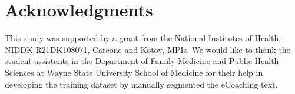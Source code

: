 \documentclass{amia}
\begin{document}
\section*{Acknowledgments}
This study was supported by a grant from the National Institutes of Health, NIDDK R21DK108071, Carcone and Kotov, MPIs. We would like to thank the student assistants in the Department of Family Medicine and Public Health Sciences at Wayne State University School of Medicine for their help in developing the training dataset by manually segmented the eCoaching text. 



\end{document}
